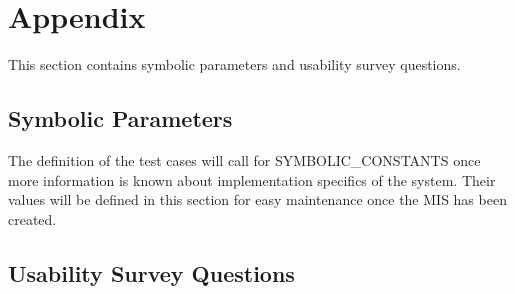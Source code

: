 \documentclass[12pt, titlepage]{article}
\begin{document}
				



\newpage

\section{Appendix}

This section contains symbolic parameters and usability survey questions.

\subsection{Symbolic Parameters}

The definition of the test cases will call for SYMBOLIC\_CONSTANTS once more information is known about implementation specifics of the system.
Their values will be defined in this section for easy maintenance once the MIS has been created.

\subsection{Usability Survey Questions} \label{subsec:UsabilitySurvey}
\end{document}
